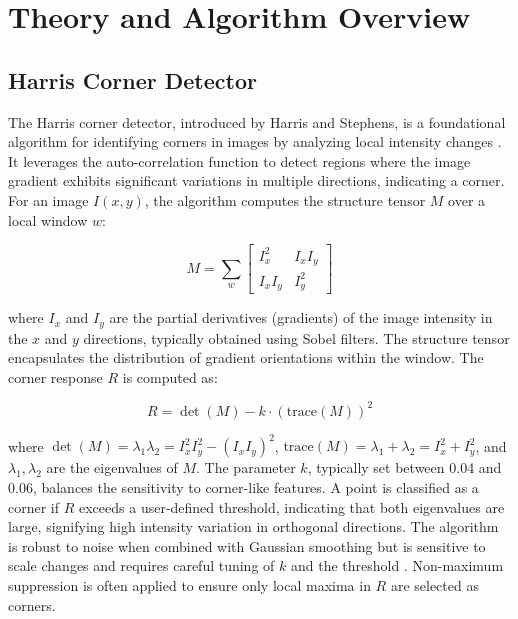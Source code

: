 \documentclass[journal]{IEEEtran}
\begin{document}
\section{Theory and Algorithm Overview}
\label{section:theory}

\subsection{Harris Corner Detector}
The Harris corner detector, introduced by Harris and Stephens, is a foundational algorithm for identifying corners in images by analyzing local intensity changes \cite{Harris_Corner}. It leverages the auto-correlation function to detect regions where the image gradient exhibits significant variations in multiple directions, indicating a corner. For an image \( I(x, y) \), the algorithm computes the structure tensor \( M \) over a local window \( w \):

\begin{equation}
M = \sum_w \begin{bmatrix} I_x^2 & I_x I_y \\ I_x I_y & I_y^2 \end{bmatrix}
\end{equation}

where \( I_x \) and \( I_y \) are the partial derivatives (gradients) of the image intensity in the \( x \) and \( y \) directions, typically obtained using Sobel filters. The structure tensor encapsulates the distribution of gradient orientations within the window. The corner response \( R \) is computed as:

\begin{equation}
R = \det(M) - k \cdot (\text{trace}(M))^2
\end{equation}

where \( \det(M) = \lambda_1 \lambda_2 = I_x^2 I_y^2 - (I_x I_y)^2 \), \( \text{trace}(M) = \lambda_1 + \lambda_2 = I_x^2 + I_y^2 \), and \( \lambda_1, \lambda_2 \) are the eigenvalues of \( M \). The parameter \( k \), typically set between 0.04 and 0.06, balances the sensitivity to corner-like features. A point is classified as a corner if \( R \) exceeds a user-defined threshold, indicating that both eigenvalues are large, signifying high intensity variation in orthogonal directions. The algorithm is robust to noise when combined with Gaussian smoothing but is sensitive to scale changes and requires careful tuning of \( k \) and the threshold \cite{Harris_Corner}. Non-maximum suppression is often applied to ensure only local maxima in \( R \) are selected as corners.\\
\end{document}
